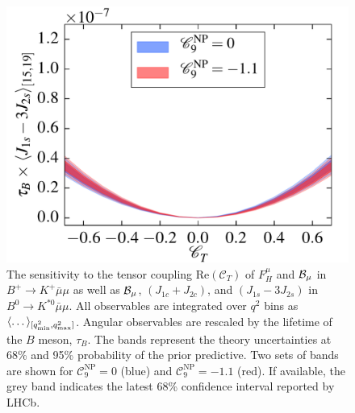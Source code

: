 \documentclass[twocolumn,epjc3]{svjour3}
\numberwithin{equation}{section}
\newcommand{\wilson}[2][{}]{\mathcal{C}_{#2}^{\mathrm{#1}}}
\renewcommand{\[}{\big[}
\renewcommand{\]}{\big]}
\renewcommand{\(}{\big(}
\renewcommand{\)}{\big)}
\newlength{\relwidth}
\begin{document}
\begin{figure}
\begin{center}
    \includegraphics[width=\relwidth]{plots/pdf/ct_Kstar_J_1s_minus_3J_2s15to19}
  \end{center}
  \caption{ The sensitivity to the tensor coupling
    $\mbox{Re}(\wilson{T})$ of $F_H^\mu$ and {${\cal B}_\mu$} in $B^+
    \to K^+ \bar\mu\mu$ {as well as} {${\cal B}_\mu$},
    $(J_{1c} + J_{2c})$, and $(J_{1s}-3 J_{2s})$ in $B^0 \to K^{*0}
    \bar\mu\mu$. All observables are integrated over $q^2$ bins as
    $\langle \dots \rangle_{[q^2_{\rm min}, q^2_{\rm max}]}$. Angular
    observables are rescaled by the lifetime of the $B$ meson,
    $\tau_B$. The bands represent the theory uncertainties at 68\% and
    95\% probability of the prior predictive.  Two sets of bands are
    shown for $\wilson[NP]{9} = 0$ (blue) and $\wilson[NP]{9} = -1.1$
    (red). If available, the grey band indicates the latest 68\%
    confidence interval reported by LHCb.}
  \label{fig:FHvsCT}
\end{figure}
\end{document}
